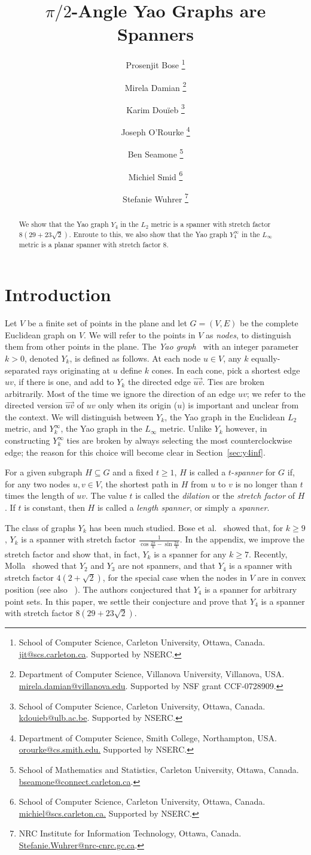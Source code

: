 \pdfoutput=1  \documentclass[11pt]{article}
\title{$\pi/2$-Angle Yao Graphs are Spanners}
\author{
Prosenjit Bose
    \thanks{School of Computer Science, Carleton University, Ottawa, Canada. \protect\url{jit@scs.carleton.ca}.
    Supported by NSERC.}
\and
Mirela Damian
    \thanks{Department of Computer Science, Villanova University, Villanova, USA.
    \protect\url{mirela.damian@villanova.edu}. Supported by NSF grant CCF-0728909.}
\and
Karim Dou\"ieb
    \thanks{School of Computer Science, Carleton University, Ottawa, Canada. \protect\url{kdouieb@ulb.ac.be}.
    Supported by NSERC.}
\and
Joseph O'Rourke
    \thanks{Department of Computer Science, Smith College, Northampton, USA. \protect\url{orourke@cs.smith.edu.}
    Supported by NSERC.}
\and
Ben Seamone
    \thanks{School of Mathematics and Statistics, Carleton University, Ottawa, Canada. \protect\url{bseamone@connect.carleton.ca}.}
\and
Michiel Smid
    \thanks{School of Computer Science, Carleton University, Ottawa, Canada. \protect\url{michiel@scs.carleton.ca.}
    Supported by NSERC.}
\and
Stefanie Wuhrer
    \thanks{NRC Institute for Information Technology, Ottawa, Canada. \protect\url{Stefanie.Wuhrer@nrc-cnrc.gc.ca}.}
}
\date{}
\begin{document}
\maketitle

\begin{abstract}
We show that the Yao graph $Y_4$ in the $L_2$ metric is a spanner with
stretch factor $8(29+23\sqrt{2})$. Enroute to this, we also show that
the Yao graph $Y^\infty_4$ in the $L_\infty$ metric is a planar spanner
with stretch factor $8$.
\end{abstract}

\section{Introduction}
Let $V$ be a finite set of points in the plane and let $G=(V,E)$ be
the complete Euclidean graph on $V$. We will refer to the points in
$V$ as \emph{nodes}, to distinguish them from other points in the
plane.
The \emph{Yao graph}~\cite{Yao82} with an integer parameter $k > 0$,
denoted $Y_k$, is defined as follows. At each node $u \in V$, any $k$
equally-separated rays originating at $u$ define $k$ cones.
In each cone, pick a shortest edge $uv$, if there is one, and add to $Y_k$
the directed edge $\overrightarrow{uv}$. Ties are broken arbitrarily.
Most of the time we ignore the direction of an edge $uv$; we refer
to the directed version $\overrightarrow{uv}$ of $uv$ only when its
origin ($u$) is important and unclear from the context.
We will distinguish between $Y_k$, the Yao graph in the Euclidean $L_2$
metric, and $Y^\infty_k$, the Yao graph in the $L_\infty$ metric. Unlike
$Y_k$ however, in constructing $Y^\infty_k$ ties are broken by always
selecting the most counterclockwise edge; the reason for this choice
will become clear in Section~\ref{sec:y4inf}.

For a given subgraph $H \subseteq G$ and a fixed $t \ge 1$, $H$ is
called a $t$-\emph{spanner} for $G$ if, for any two nodes
$u,v \in V$, the shortest path in $H$ from $u$ to $v$ is no longer than
$t$ times the length of $uv$.
The value $t$ is called the \emph{dilation} or the
\emph{stretch factor} of $H$. If $t$ is constant, then $H$ is called a
\emph{length spanner}, or simply a \emph{spanner}.

The class of graphs $Y_k$ has been much studied. Bose et al.~\cite{bmnsz-agbsp-03}
showed that, for $k \geq 9$, $Y_k$ is a spanner with stretch factor
$\frac{1}{\cos \frac{2\pi}{k} - \sin \frac{2\pi}{k}}$. In the appendix, we improve the stretch factor and show that, in fact, 
$Y_k$ is a spanner for any $k \geq 7$.
Recently, Molla~\cite{M09} showed that $Y_2$ and $Y_3$ are 
not spanners, and that $Y_4$ is a spanner with stretch factor 
$4(2+\sqrt{2})$, for the special case when the nodes in $V$ are 
in convex position (see also ~\cite{DMP09}). 
The authors conjectured that $Y_4$ is a spanner for arbitrary point 
sets.
In this paper, we settle their conjecture and prove that $Y_4$ is a
spanner with stretch factor $8(29+23\sqrt{2})$.
\end{document}
